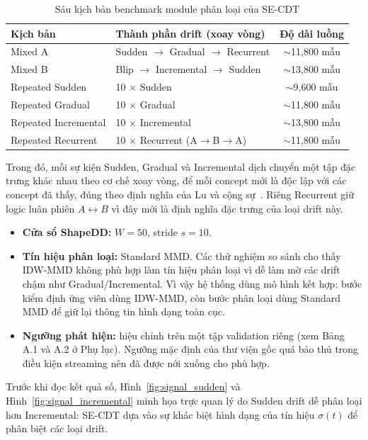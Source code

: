 \begin{table}[H]
	\centering
	\caption{Sáu kịch bản benchmark module phân loại của SE-CDT}
	\label{tab:classification-scenarios}
	\begin{tabular}{|l|l|c|}
		\hline
		\textbf{Kịch bản} & \textbf{Thành phần drift (xoay vòng)} & \textbf{Độ dài luồng} \\
		\hline
		Mixed A        & Sudden $\to$ Gradual $\to$ Recurrent   & $\sim$11,800 mẫu \\
		Mixed B        & Blip $\to$ Incremental $\to$ Sudden    & $\sim$13,800 mẫu \\
		Repeated Sudden      & 10 $\times$ Sudden                     & $\sim$9,600 mẫu  \\
		Repeated Gradual     & 10 $\times$ Gradual                    & $\sim$11,800 mẫu \\
		Repeated Incremental & 10 $\times$ Incremental                & $\sim$13,800 mẫu \\
		Repeated Recurrent   & 10 $\times$ Recurrent (A$\to$B$\to$A)  & $\sim$11,800 mẫu \\
		\hline
	\end{tabular}
\end{table}

Trong đó, mỗi sự kiện Sudden, Gradual và Incremental dịch chuyển một tập đặc trưng khác nhau theo cơ chế xoay vòng, để mỗi concept mới là độc lập với các concept đã thấy, đúng theo định nghĩa của Lu và cộng sự~\cite{lu2018learning}. Riêng Recurrent giữ logic luân phiên $A \leftrightarrow B$ vì đây mới là định nghĩa đặc trưng của loại drift này.

\begin{itemize}
	\item \textbf{Cửa sổ ShapeDD:} $W = 50$, stride $s = 10$.
	\item \textbf{Tín hiệu phân loại:} Standard MMD. Các thử nghiệm so sánh cho thấy IDW-MMD không phù hợp làm tín hiệu phân loại vì dễ làm mờ các drift chậm như Gradual/Incremental. Vì vậy hệ thống dùng mô hình kết hợp: bước kiểm định ứng viên dùng IDW-MMD, còn bước phân loại dùng Standard MMD để giữ lại thông tin hình dạng toàn cục.
	\item \textbf{Ngưỡng phát hiện:} hiệu chỉnh trên một tập validation riêng (xem Bảng A.1 và A.2 ở Phụ lục). Ngưỡng mặc định của thư viện gốc quá bảo thủ trong điều kiện streaming nên đã được nới xuống cho phù hợp.
\end{itemize}

Trước khi đọc kết quả số, Hình~\ref{fig:signal_sudden} và Hình~\ref{fig:signal_incremental} minh họa trực quan lý do Sudden drift dễ phân loại hơn Incremental: SE-CDT dựa vào sự khác biệt hình dạng của tín hiệu $\sigma(t)$ để phân biệt các loại drift.

